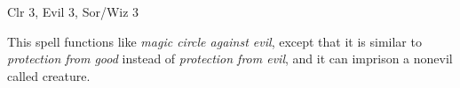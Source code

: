 
\begin{description*}
\item[Level:] Clr 3, Evil 3, Sor/Wiz 3
\end{description*}

This spell functions like \textit{magic circle against evil}, except that it is
similar to \textit{protection from good} instead of \textit{protection from evil},
and it can imprison a nonevil called creature.